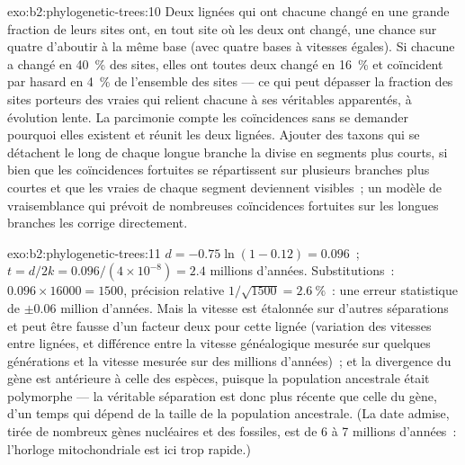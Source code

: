 \begin{solution}{exo:b2:phylogenetic-trees:10}
Deux lignées qui ont chacune changé en une grande fraction de leurs sites
ont, en tout site où les deux ont changé, une chance sur quatre d'aboutir
à la même base (avec quatre bases à vitesses égales). Si chacune a changé
en \qty{40}{\%} des sites, elles ont toutes deux changé en \qty{16}{\%}
et coïncident par hasard en \qty{4}{\%} de l'ensemble des sites --- ce qui
peut dépasser la fraction des sites porteurs des vraies 
qui relient chacune à ses véritables apparentés, à évolution lente. La
parcimonie compte les coïncidences sans se demander pourquoi elles
existent et réunit les deux lignées. Ajouter des taxons qui se détachent
le long de chaque longue branche la divise en segments plus courts, si
bien que les coïncidences fortuites se répartissent sur plusieurs
branches plus courtes et que les vraies  de chaque segment
deviennent visibles~; un modèle de vraisemblance qui prévoit de
nombreuses coïncidences fortuites sur les longues branches les corrige
directement.
\end{solution}

\begin{solution}{exo:b2:phylogenetic-trees:11}
$d = -0.75\ln(1 - 0.12) = 0.096$~; $t = d/2k = 0.096/(4\times 10^{-8})
= 2.4$ millions d'années. Substitutions~: $0.096\times \num{16000} =
1500$, précision relative $1/\sqrt{1500} = \qty{2.6}{\%}$~: une erreur
statistique de $\pm 0.06$ million d'années. Mais la vitesse est étalonnée
sur d'autres séparations et peut être fausse d'un facteur deux pour cette
lignée (variation des vitesses entre lignées, et différence entre la
vitesse généalogique mesurée sur quelques générations et la vitesse
mesurée sur des millions d'années)~; et la divergence du gène est
antérieure à celle des espèces, puisque la population ancestrale était
polymorphe --- la véritable séparation est donc plus récente que celle du
gène, d'un temps qui dépend de la taille de la population ancestrale. (La
date admise, tirée de nombreux gènes nucléaires et des fossiles, est de 6
à 7 millions d'années~: l'horloge mitochondriale est ici trop rapide.)
\end{solution}

